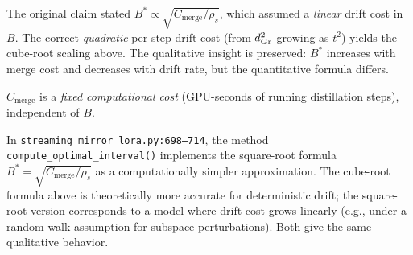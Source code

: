 \begin{remark}
The original claim stated $B^* \propto \sqrt{C_{\mathrm{merge}}/\rho_s}$,
which assumed a \emph{linear} drift cost in $B$. The correct
\emph{quadratic} per-step drift cost (from $d_{\mathrm{Gr}}^2$ growing as $t^2$)
yields the cube-root scaling above. The qualitative insight is
preserved: $B^*$ increases with merge cost and decreases with drift
rate, but the quantitative formula differs.
\end{remark}

\begin{remark}
$C_{\mathrm{merge}}$ is a \emph{fixed computational cost} (GPU-seconds
of running distillation steps), independent of $B$.
\end{remark}

\begin{remark}
In \texttt{streaming\_mirror\_lora.py:698--714}, the method
\texttt{compute\_optimal\_interval()} implements the square-root
formula $B^* = \sqrt{C_{\mathrm{merge}}/\rho_s}$ as a computationally
simpler approximation. The cube-root formula above is theoretically
more accurate for deterministic drift; the square-root version
corresponds to a model where drift cost grows linearly (e.g., under
a random-walk assumption for subspace perturbations). Both give the
same qualitative behavior.
\end{remark}
